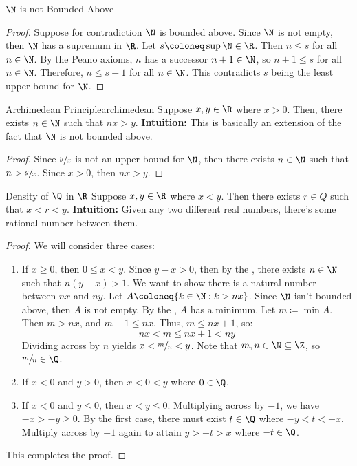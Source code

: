 \begin{thmbox}{$\N$ is not Bounded Above}{}
    \begin{proof}
        Suppose for contradiction $\N$ is bounded above. Since $\N$ is not empty, then $\N$ has a supremum in $\R$. Let $s \coloneq \sup \N \in \R$. Then $n \leq s$ for all $n \in \N$. By the Peano axioms, $n$ has a successor $n+1 \in \N$, so $n+1 \leq s$ for all $n \in \N$. Therefore, $n \leq s - 1$ for all $n \in \N$. This contradicts $s$ being the least upper bound for $\N$.
    \end{proof}
\end{thmbox}

\begin{thmbox}{Archimedean Principle}{archimedean}
    Suppose $x,y \in \R$ where $x > 0$. Then, there exists $n \in \N$ such that $nx > y$.
    \tcblower
    \textbf{Intuition:} This is basically an extension of the fact that $\N$ is not bounded above.
    \begin{proof}
        Since $\sfrac{y}{x}$ is not an upper bound for $\N$, then there exists $n \in \N$ such that $n > \sfrac{y}{x}$. Since $x > 0$, then $nx > y$.
    \end{proof}
\end{thmbox}

\begin{thmbox}{Density of $\Q$ in $\R$}{}
    Suppose $x,y \in \R$ where $x < y$. Then there exists $r \in Q$ such that $x < r < y$.
    \tcblower
    \textbf{Intuition:} Given any two different real numbers, there's some rational number between them.
    \begin{proof}
        We will consider three cases:
        \begin{enumerate}
            \item If $x \geq 0$, then $0 \leq x < y$. Since $y - x > 0$, then by the , there exists $n \in \N$ such that $n(y-x) > 1$. We want to show there is a natural number between $nx$ and $ny$. Let $A \coloneq \{ k \in \N : k > nx \}$. Since $\N$ isn't bounded above, then $A$ is not empty. By the , $A$ has a minimum. Let $m \coloneq \min A$. Then $m > nx$, and $m-1 \leq nx$. Thus, $m \leq nx+1$, so:
            \[ nx < m \leq nx+1 < ny \]
            Dividing across by $n$ yields $x < \sfrac{m}{n} < y$. Note that $m,n \in \N \subseteq \Z$, so $\sfrac{m}{n} \in \Q$.
            \item If $x < 0$ and $y > 0$, then $x < 0 < y$ where $0 \in \Q$.
            \item If $x < 0$ and $y \leq 0$, then $x < y \leq 0$. Multiplying across by $-1$, we have $-x > -y \geq 0$. By the first case, there must exist $t \in \Q$ where $-y < t < -x$. Multiply across by $-1$ again to attain $y > -t > x$ where $-t \in \Q$.
        \end{enumerate}
        This completes the proof.
    \end{proof}
\end{thmbox}

